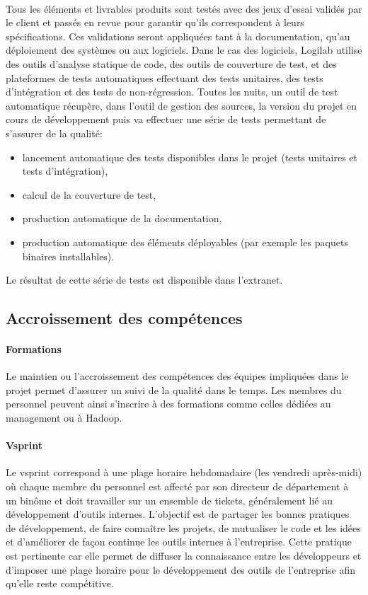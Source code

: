 \documentclass {report}
\begin{document}
\paragraph{}
Tous les éléments et livrables produits sont testés avec des jeux d’essai validés par le client et passés en revue pour garantir qu’ils correspondent à leurs spécifications. Ces validations seront appliquées tant à la documentation, qu’au déploiement des systèmes ou aux logiciels. Dans le cas des logiciels, Logilab utilise des outils d’analyse statique de code, des outils de couverture de test, et des plateformes de tests automatiques effectuant des tests unitaires, des tests d’intégration et des tests de non-régression. Toutes les nuits, un outil de test automatique récupère, dans l’outil de gestion des sources, la version du projet en cours de développement puis va effectuer une série de tests permettant de s’assurer de la qualité: 
\begin{itemize}
\item lancement automatique des tests disponibles dans le projet (tests unitaires et tests d’intégration),
\item calcul de la couverture de test,
\item production automatique de la documentation,
\item production automatique des éléments déployables (par exemple les paquets binaires installables). 
\end{itemize}
    Le résultat de cette série de tests est disponible dans l’extranet.
\subsection{Accroissement des compétences}
\paragraph{Formations} Le maintien ou l’accroissement des compétences des équipes impliquées dans le projet permet d’assurer un suivi de la qualité dans le temps. Les membres du personnel peuvent ainsi s'inscrire à des formations comme celles dédiées au management ou à Hadoop\footnotemark[1].
\paragraph{Vsprint}
Le vsprint correspond à une plage horaire hebdomadaire (les vendredi après-midi) où chaque membre du personnel est affecté par son directeur de département à un binôme et doit travailler sur un ensemble de tickets, généralement lié au développement d'outils internes. L'objectif est de partager les bonnes pratiques de développement, de faire connaître les projets, de mutualiser le code et les idées et d'améliorer de façon continue les outils internes à l'entreprise. Cette pratique est pertinente car elle permet de diffuser la connaissance entre les développeurs et d'imposer une plage horaire pour le développement des outils de l'entreprise afin qu'elle reste compétitive.
\end{document}
